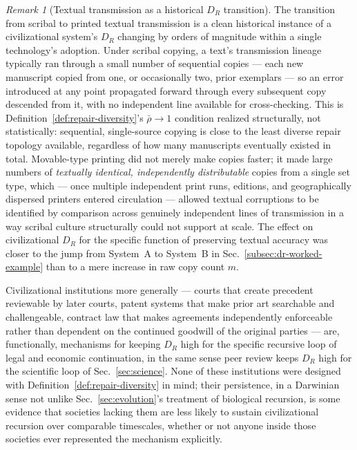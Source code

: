 \documentclass[12pt,a4paper]{article}
\theoremstyle{plain}
\theoremstyle{definition}
\theoremstyle{remark}
\newtheorem{remark}[theorem]{Remark}
\newcommand{\DR}{D_R}
\begin{document}
\begin{remark}[Textual transmission as a historical $\DR$ transition]
\label{rem:printing-press}
The transition from scribal to printed textual transmission is a clean historical instance of a civilizational system's $\DR$ changing by orders of magnitude within a single technology's adoption. Under scribal copying, a text's transmission lineage typically ran through a small number of sequential copies — each new manuscript copied from one, or occasionally two, prior exemplars — so an error introduced at any point propagated forward through every subsequent copy descended from it, with no independent line available for cross-checking. This is Definition~\ref{def:repair-diversity}'s $\bar\rho \to 1$ condition realized structurally, not statistically: sequential, single-source copying is close to the least diverse repair topology available, regardless of how many manuscripts eventually existed in total. Movable-type printing did not merely make copies faster; it made large numbers of \emph{textually identical, independently distributable} copies from a single set type, which — once multiple independent print runs, editions, and geographically dispersed printers entered circulation — allowed textual corruptions to be identified by comparison across genuinely independent lines of transmission in a way scribal culture structurally could not support at scale. The effect on civilizational $\DR$ for the specific function of preserving textual accuracy was closer to the jump from System~A to System~B in Sec.~\ref{subsec:dr-worked-example} than to a mere increase in raw copy count $m$.
\end{remark}

Civilizational institutions more generally — courts that create precedent reviewable by later courts, patent systems that make prior art searchable and challengeable, contract law that makes agreements independently enforceable rather than dependent on the continued goodwill of the original parties — are, functionally, mechanisms for keeping $\DR$ high for the specific recursive loop of legal and economic continuation, in the same sense peer review keeps $\DR$ high for the scientific loop of Sec.~\ref{sec:science}. None of these institutions were designed with Definition~\ref{def:repair-diversity} in mind; their persistence, in a Darwinian sense not unlike Sec.~\ref{sec:evolution}'s treatment of biological recursion, is some evidence that societies lacking them are less likely to sustain civilizational recursion over comparable timescales, whether or not anyone inside those societies ever represented the mechanism explicitly.
\end{document}
